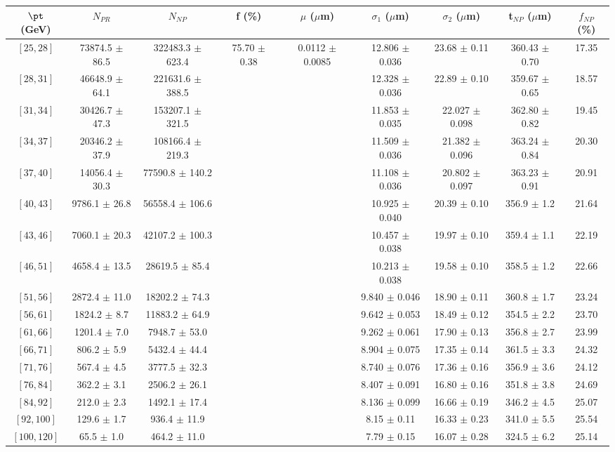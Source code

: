 \begin{tabular}{c||c|c|c|c|c|c|c||c}
$\pt$ (GeV) & $N_{PR}$ & $N_{NP}$ & f (\%) & $\mu$ ($\mu$m) & $\sigma_1$ ($\mu$m) & $\sigma_2$ ($\mu$m)  & t$_{NP}$ ($\mu$m) & $f_{NP}$ (\%) \\
\hline
$[25, 28]$ & 73874.5 $\pm$ 86.5 & 322483.3 $\pm$ 623.4 & \multirow{17}{*}{75.70 $\pm$ 0.38} & \multirow{17}{*}{0.0112 $\pm$ 0.0085} & 12.806 $\pm$ 0.036 & 23.68 $\pm$ 0.11 & 360.43 $\pm$ 0.70 & 17.35\\
$[28, 31]$ & 46648.9 $\pm$ 64.1 & 221631.6 $\pm$ 388.5 &  &  & 12.328 $\pm$ 0.036 & 22.89 $\pm$ 0.10 & 359.67 $\pm$ 0.65 & 18.57\\
$[31, 34]$ & 30426.7 $\pm$ 47.3 & 153207.1 $\pm$ 321.5 &  &  & 11.853 $\pm$ 0.035 & 22.027 $\pm$ 0.098 & 362.80 $\pm$ 0.82 & 19.45\\
$[34, 37]$ & 20346.2 $\pm$ 37.9 & 108166.4 $\pm$ 219.3 &  &  & 11.509 $\pm$ 0.036 & 21.382 $\pm$ 0.096 & 363.24 $\pm$ 0.84 & 20.30\\
$[37, 40]$ & 14056.4 $\pm$ 30.3 & 77590.8 $\pm$ 140.2 &  &  & 11.108 $\pm$ 0.036 & 20.802 $\pm$ 0.097 & 363.23 $\pm$ 0.91 & 20.91\\
$[40, 43]$ & 9786.1 $\pm$ 26.8 & 56558.4 $\pm$ 106.6 &  &  & 10.925 $\pm$ 0.040 & 20.39 $\pm$ 0.10 & 356.9 $\pm$ 1.2 & 21.64\\
$[43, 46]$ & 7060.1 $\pm$ 20.3 & 42107.2 $\pm$ 100.3 &  &  & 10.457 $\pm$ 0.038 & 19.97 $\pm$ 0.10 & 359.4 $\pm$ 1.1 & 22.19\\
$[46, 51]$ & 4658.4 $\pm$ 13.5 & 28619.5 $\pm$ 85.4 &  &  & 10.213 $\pm$ 0.038 & 19.58 $\pm$ 0.10 & 358.5 $\pm$ 1.2 & 22.66\\
$[51, 56]$ & 2872.4 $\pm$ 11.0 & 18202.2 $\pm$ 74.3 &  &  & 9.840 $\pm$ 0.046 & 18.90 $\pm$ 0.11 & 360.8 $\pm$ 1.7 & 23.24\\
$[56, 61]$ & 1824.2 $\pm$ 8.7 & 11883.2 $\pm$ 64.9 &  &  & 9.642 $\pm$ 0.053 & 18.49 $\pm$ 0.12 & 354.5 $\pm$ 2.2 & 23.70\\
$[61, 66]$ & 1201.4 $\pm$ 7.0 & 7948.7 $\pm$ 53.0 &  &  & 9.262 $\pm$ 0.061 & 17.90 $\pm$ 0.13 & 356.8 $\pm$ 2.7 & 23.99\\
$[66, 71]$ & 806.2 $\pm$ 5.9 & 5432.4 $\pm$ 44.4 &  &  & 8.904 $\pm$ 0.075 & 17.35 $\pm$ 0.14 & 361.5 $\pm$ 3.3 & 24.32\\
$[71, 76]$ & 567.4 $\pm$ 4.5 & 3777.5 $\pm$ 32.3 &  &  & 8.740 $\pm$ 0.076 & 17.36 $\pm$ 0.16 & 356.9 $\pm$ 3.6 & 24.12\\
$[76, 84]$ & 362.2 $\pm$ 3.1 & 2506.2 $\pm$ 26.1 &  &  & 8.407 $\pm$ 0.091 & 16.80 $\pm$ 0.16 & 351.8 $\pm$ 3.8 & 24.69\\
$[84, 92]$ & 212.0 $\pm$ 2.3 & 1492.1 $\pm$ 17.4 &  &  & 8.136 $\pm$ 0.099 & 16.66 $\pm$ 0.19 & 346.2 $\pm$ 4.5 & 25.07\\
$[92, 100]$ & 129.6 $\pm$ 1.7 & 936.4 $\pm$ 11.9 &  &  & 8.15 $\pm$ 0.11 & 16.33 $\pm$ 0.23 & 341.0 $\pm$ 5.5 & 25.54\\
$[100, 120]$ & 65.5 $\pm$ 1.0 & 464.2 $\pm$ 11.0 &  &  & 7.79 $\pm$ 0.15 & 16.07 $\pm$ 0.28 & 324.5 $\pm$ 6.2 & 25.14\\
\end{tabular}
